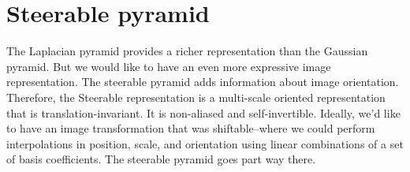 %
%
%
%
%
%
%
\section{Steerable pyramid}
%

The Laplacian pyramid provides a richer representation than the Gaussian pyramid. But we would like to have an even more expressive image representation.  The steerable pyramid adds information about image orientation. Therefore, the Steerable  representation is a multi-scale oriented representation that is translation-invariant. It is non-aliased and self-invertible. Ideally, we'd like to have an image transformation that was
shiftable--where we could perform interpolations in position, scale,
and orientation using linear combinations of a set of basis
coefficients.  The steerable pyramid goes part way there.

